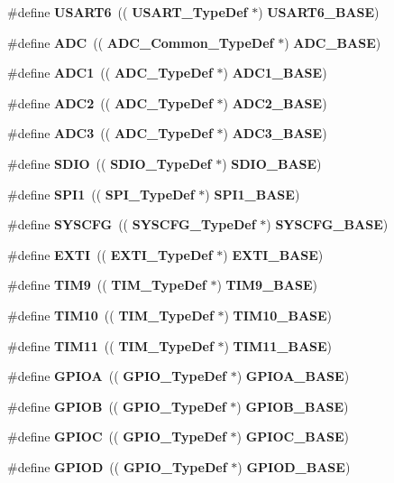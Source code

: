 \begin{DoxyCompactItemize}
\item 
\#define \textbf{ U\+S\+A\+R\+T6}~((\textbf{ U\+S\+A\+R\+T\+\_\+\+Type\+Def} $\ast$) \textbf{ U\+S\+A\+R\+T6\+\_\+\+B\+A\+SE})
\item 
\#define \textbf{ A\+DC}~((\textbf{ A\+D\+C\+\_\+\+Common\+\_\+\+Type\+Def} $\ast$) \textbf{ A\+D\+C\+\_\+\+B\+A\+SE})
\item 
\#define \textbf{ A\+D\+C1}~((\textbf{ A\+D\+C\+\_\+\+Type\+Def} $\ast$) \textbf{ A\+D\+C1\+\_\+\+B\+A\+SE})
\item 
\#define \textbf{ A\+D\+C2}~((\textbf{ A\+D\+C\+\_\+\+Type\+Def} $\ast$) \textbf{ A\+D\+C2\+\_\+\+B\+A\+SE})
\item 
\#define \textbf{ A\+D\+C3}~((\textbf{ A\+D\+C\+\_\+\+Type\+Def} $\ast$) \textbf{ A\+D\+C3\+\_\+\+B\+A\+SE})
\item 
\#define \textbf{ S\+D\+IO}~((\textbf{ S\+D\+I\+O\+\_\+\+Type\+Def} $\ast$) \textbf{ S\+D\+I\+O\+\_\+\+B\+A\+SE})
\item 
\#define \textbf{ S\+P\+I1}~((\textbf{ S\+P\+I\+\_\+\+Type\+Def} $\ast$) \textbf{ S\+P\+I1\+\_\+\+B\+A\+SE})
\item 
\#define \textbf{ S\+Y\+S\+C\+FG}~((\textbf{ S\+Y\+S\+C\+F\+G\+\_\+\+Type\+Def} $\ast$) \textbf{ S\+Y\+S\+C\+F\+G\+\_\+\+B\+A\+SE})
\item 
\#define \textbf{ E\+X\+TI}~((\textbf{ E\+X\+T\+I\+\_\+\+Type\+Def} $\ast$) \textbf{ E\+X\+T\+I\+\_\+\+B\+A\+SE})
\item 
\#define \textbf{ T\+I\+M9}~((\textbf{ T\+I\+M\+\_\+\+Type\+Def} $\ast$) \textbf{ T\+I\+M9\+\_\+\+B\+A\+SE})
\item 
\#define \textbf{ T\+I\+M10}~((\textbf{ T\+I\+M\+\_\+\+Type\+Def} $\ast$) \textbf{ T\+I\+M10\+\_\+\+B\+A\+SE})
\item 
\#define \textbf{ T\+I\+M11}~((\textbf{ T\+I\+M\+\_\+\+Type\+Def} $\ast$) \textbf{ T\+I\+M11\+\_\+\+B\+A\+SE})
\item 
\#define \textbf{ G\+P\+I\+OA}~((\textbf{ G\+P\+I\+O\+\_\+\+Type\+Def} $\ast$) \textbf{ G\+P\+I\+O\+A\+\_\+\+B\+A\+SE})
\item 
\#define \textbf{ G\+P\+I\+OB}~((\textbf{ G\+P\+I\+O\+\_\+\+Type\+Def} $\ast$) \textbf{ G\+P\+I\+O\+B\+\_\+\+B\+A\+SE})
\item 
\#define \textbf{ G\+P\+I\+OC}~((\textbf{ G\+P\+I\+O\+\_\+\+Type\+Def} $\ast$) \textbf{ G\+P\+I\+O\+C\+\_\+\+B\+A\+SE})
\item 
\#define \textbf{ G\+P\+I\+OD}~((\textbf{ G\+P\+I\+O\+\_\+\+Type\+Def} $\ast$) \textbf{ G\+P\+I\+O\+D\+\_\+\+B\+A\+SE})

\end{DoxyCompactItemize}
